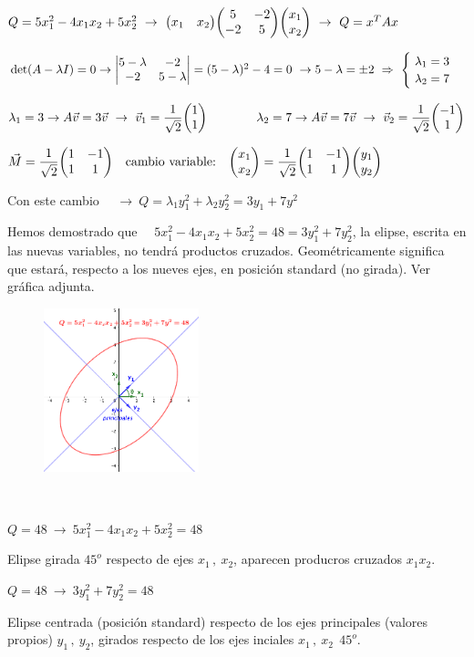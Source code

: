 $Q=5x_1^2-4x_1x_2+5x_2^2\ \to \ \mqty(x_1&x_2) \mqty(5&-2\\-2&5) \mqty (x_1\\x_2) \ \to \ Q=x^TAx$

$\det(A-\lambda I)=0 \to \mqty|5-\lambda & -2 \\ -2& 5-\lambda|=(5-\lambda)^2-4=0 \ \to 5-\lambda=\pm 2 \ \Rightarrow \ \begin{cases} \ \lambda_1=3 \\ \ \lambda_2=7 \end{cases}$

$\lambda_1=3 \to A\vec v = 3 \vec v \ \to \ \vec v_1=\dfrac 1{\sqrt{2}} \mqty(1\\1)
\qquad \qquad
\lambda_2=7 \to A\vec v = 7 \vec v \ \to \ \vec v_2=\dfrac 1{\sqrt{2}} \mqty(-1\\1)$

$\vec M=\dfrac 1{\sqrt{2}}\mqty(1&-1\\1&1)  \quad \text{cambio variable:} \quad \mqty(x_1\\x_2) = \dfrac 1{\sqrt{2}}\mqty(1&-1\\1&1) \mqty(y_1\\y_2)$

Con este cambio $\quad  \to \  Q=\lambda_1y_1^2+\lambda_2y_2^2=3y_1+7y^2$

Hemos demostrado que $\quad 5x_1^2-4x_1x_2+5x_2^2=48=3y_1^2+7y_2^2$, la elipse, escrita en las nuevas variables, no tendrá productos cruzados. Geométricamente significa que estará, respecto a los nueves ejes, en posición standard (no girada). Ver gráfica adjunta.

\vspace{5mm}
\begin{multicols}{2}
\begin{figure}[H]
	\centering
	\includegraphics[width=0.4\textwidth]{img-polares/polares54.png}
\end{figure}
$\quad$

$Q=48 \ \to \  5x_1^2-4x_1x_2+5x_2^2=48\ $

Elipse girada $45^o$ respecto de ejes $x_1\, , \  x_2$, aparecen producros cruzados $x_1x_2$.

$Q=48 \ \to \  3y_1^2+7y_2^2=48\ $

Elipse centrada (posición standard) respecto de los ejes principales (valores propios) $y_1\, , \ y_2$, girados respecto de los ejes inciales $x_1\, , \  x_2\ \ 45^o$. 


\end{multicols}





